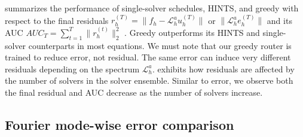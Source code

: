 \documentclass{article} %
\begin{document}
 summarizes the performance of single-solver schedules, HINTS, and greedy with respect to the final residuals $r_h^{(T)} =\|f_h - \mathcal{L}_h^a u_h^{(T)}\|$ or $\|\mathcal{L}_h^a e_h^{(T)}\|$ and its AUC $AUC_T = \sum_{t = 1}^T\|r^{(t)}_h\|^2_2$ . Greedy outperforms its HINTS and single-solver counterparts in most equations. We must note that our greedy router is trained to reduce error, not residual. The same error can induce very different residuals depending on the spectrum $\mathcal{L}_h^a$.  exhibits how residuals are affected by the number of solvers in the solver ensemble. Similar to error, we observe both the final residual and AUC decrease as the number of solvers increase.



\subsection{Fourier mode-wise error comparison} \label{sec:fouriermodeerrorcomparison}

 
\end{document}
